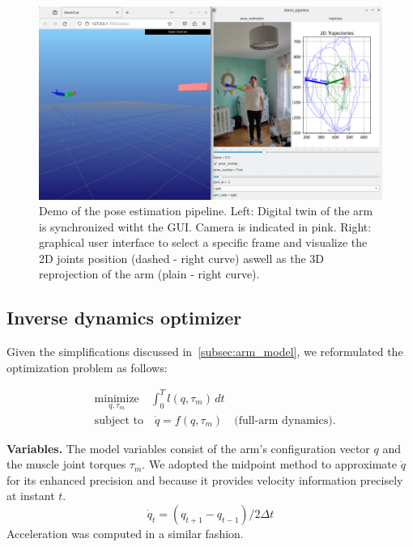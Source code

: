 \begin{figure}
    \centering
    \includegraphics[width=16cm]{figures/arm_demo.png}
    \caption{Demo of the pose estimation pipeline.
    Left: Digital twin of the arm is synchronized witht the GUI. Camera is indicated in pink.
    Right: graphical user interface to select a specific frame
    and visualize the 2D joints position (dashed - right curve) aswell as the 3D reprojection of the arm (plain - right curve).}
    \label{fig:demo}
\end{figure}

\subsection{Inverse dynamics optimizer}
\label{subsec:inverse_dynamics}

Given the simplifications discussed in~\cref{subsec:arm_model}, we reformulated the optimization problem as follows:

\begin{equation*}
    \begin{aligned}
        & \underset{q,\tau_m}{\text{minimize}} \quad \int_{0}^{T} l(q, \tau_m)\, dt \\
        & \text{subject to} \quad \dot{q} = f(q, \tau_m) \quad \text{(full-arm dynamics)}.
    \end{aligned}
\end{equation*}

\noindent\textbf{Variables.} The model variables consist of the arm's configuration vector \(q\) and the muscle joint torques \(\tau_m\). 
We adopted the midpoint method to approximate \(\dot{q}\) for its enhanced precision and because it provides velocity information precisely 
at instant \(t\).
\[
    \dot{q}_t = (q_{t + 1} - q_{t - 1}) / 2\Delta t
\]
Acceleration was computed in a similar fashion.

